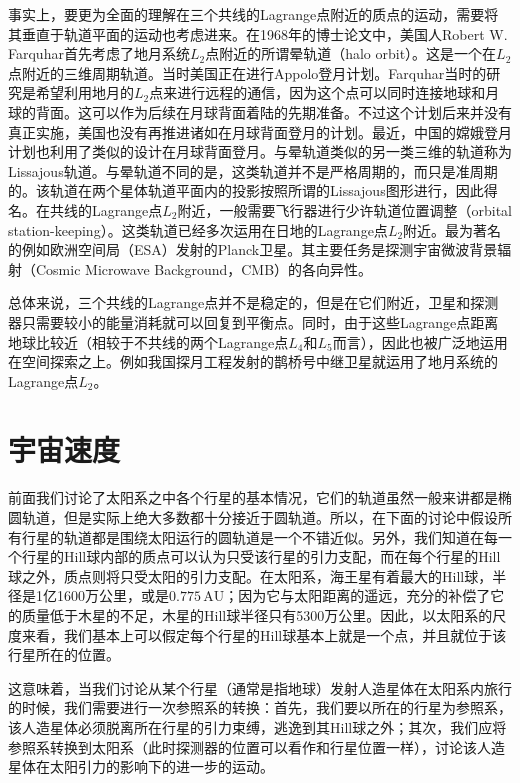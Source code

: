 \documentclass[a4paper,openany]{book}
\begin{document}
事实上，要更为全面的理解在三个共线的Lagrange点附近的质点的运动，需要将其垂直于轨道平面的运动也考虑进来。在1968年的博士论文中，美国人Robert W. Farquhar首先考虑了地月系统$L_2$点附近的所谓晕轨道（halo orbit）。这是一个在$L_2$点附近的三维周期轨道。当时美国正在进行Appolo登月计划。Farquhar当时的研究是希望利用地月的$L_2$点来进行远程的通信，因为这个点可以同时连接地球和月球的背面。这可以作为后续在月球背面着陆的先期准备。不过这个计划后来并没有真正实施，美国也没有再推进诸如在月球背面登月的计划。最近，中国的嫦娥登月计划也利用了类似的设计在月球背面登月。与晕轨道类似的另一类三维的轨道称为Lissajous轨道。与晕轨道不同的是，这类轨道并不是严格周期的，而只是准周期的。该轨道在两个星体轨道平面内的投影按照所谓的Lissajous图形进行，因此得名。在共线的Lagrange点$L_2$附近，一般需要飞行器进行少许轨道位置调整（orbital station-keeping）。这类轨道已经多次运用在日地的Lagrange点$L_2$附近。最为著名的例如欧洲空间局（ESA）发射的Planck卫星。其主要任务是探测宇宙微波背景辐射（Cosmic Microwave Background，CMB）的各向异性。

总体来说，三个共线的Lagrange点并不是稳定的，但是在它们附近，卫星和探测器只需要较小的能量消耗就可以回复到平衡点。同时，由于这些Lagrange点距离地球比较近（相较于不共线的两个Lagrange点$L_4$和$L_5$而言），因此也被广泛地运用在空间探索之上。例如我国探月工程发射的鹊桥号中继卫星就运用了地月系统的Lagrange点$L_2$。

\chapter*{宇宙速度}

前面我们讨论了太阳系之中各个行星的基本情况，它们的轨道虽然一般来讲都是椭圆轨道，但是实际上绝大多数都十分接近于圆轨道。所以，在下面的讨论中假设所有行星的轨道都是围绕太阳运行的圆轨道是一个不错近似。另外，我们知道在每一个行星的Hill球内部的质点可以认为只受该行星的引力支配，而在每个行星的Hill球之外，质点则将只受太阳的引力支配。在太阳系，海王星有着最大的Hill球，半径是1亿1600万公里，或是$0.775\,\mathrm{AU}$；因为它与太阳距离的遥远，充分的补偿了它的质量低于木星的不足，木星的Hill球半径只有5300万公里。因此，以太阳系的尺度来看，我们基本上可以假定每个行星的Hill球基本上就是一个点，并且就位于该行星所在的位置。

这意味着，当我们讨论从某个行星（通常是指地球）发射人造星体在太阳系内旅行的时候，我们需要进行一次参照系的转换：首先，我们要以所在的行星为参照系，该人造星体必须脱离所在行星的引力束缚，逃逸到其Hill球之外；其次，我们应将参照系转换到太阳系（此时探测器的位置可以看作和行星位置一样），讨论该人造星体在太阳引力的影响下的进一步的运动。
\end{document}
